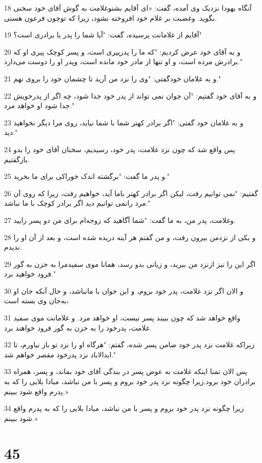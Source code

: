 \par 18 آنگاه یهودا نزدیک وی آمده، گفت: «ای آقایم بشنوغلامت به گوش آقای خود سخنی بگوید. وغضبت بر غلام خود افروخته نشود، زیرا که توچون فرعون هستی.
\par 19 آقایم از غلامانت پرسیده، گفت: "آیا شما را پدر یا برادری است؟"
\par 20 و به آقای خود عرض کردیم: "که ما را پدرپیری است، و پسر کوچک پیری او که برادرش مرده است، و او تنها از مادر خود مانده است، وپدر او را دوست می‌دارد."
\par 21 و به غلامان خودگفتی: "وی را نزد من آرید تا چشمان خود را بروی نهم."
\par 22 و به آقای خود گفتیم: "آن جوان نمی تواند از پدر خود جدا شود، چه اگر از پدرخویش جدا شود او خواهد مرد."
\par 23 و به غلامان خود گفتی: "اگر برادر کهتر شما با شما نیاید، روی مرا دیگر نخواهید دید."
\par 24 پس واقع شد که چون نزد غلامت، پدر خود، رسیدیم، سخنان آقای خود را بدو باز‌گفتیم.
\par 25 و پدر ما گفت: "برگشته اندک خوراکی برای ما بخرید."
\par 26 گفتیم: "نمی توانیم رفت، لیکن اگر برادر کهتر باما آید، خواهیم رفت، زیرا که روی آن مرد رانمی توانیم دید اگر برادر کوچک با ما نباشد."
\par 27 وغلامت، پدر من، به ما گفت: "شما آگاهید که زوجه‌ام برای من دو پسر زایید.
\par 28 و یکی از نزدمن بیرون رفت، و من گفتم هر آینه دریده شده است، و بعد از آن او را ندیدم.
\par 29 اگر این را نیز ازنزد من ببرید، و زیانی بدو رسد، همانا موی سفیدمرا به حزن به گور فرود خواهید برد."
\par 30 و الان اگر نزد غلامت، پدر خود بروم، و این جوان با مانباشد، و حال آنکه جان او به‌جان وی بسته است،
\par 31 واقع خواهد شد که چون ببیند پسر نیست، او خواهد مرد. و غلامانت موی سفید غلامت، پدرخود را به حزن به گور فرود خواهند برد.
\par 32 زیراکه غلامت نزد پدر خود ضامن پسر شده، گفتم: "هرگاه او را نزد تو باز نیاورم، تا ابدالاباد نزد پدرخود مقصر خواهم شد."
\par 33 پس الان تمنا اینکه غلامت به عوض پسر در بندگی آقای خود بماند، و پسر، همراه برادران خود برود.زیرا چگونه نزد پدر خود بروم و پسر با من نباشد، مبادا بلایی را که به پدرم واقع شود ببینم.»
\par 34 زیرا چگونه نزد پدر خود بروم و پسر با من نباشد، مبادا بلایی را که به پدرم واقع شود ببینم.»
 
\chapter{45}

